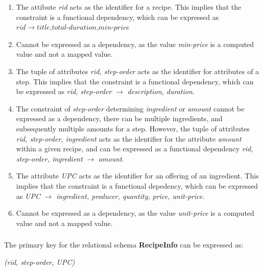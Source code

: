 \documentclass[letterpaper]{article}
\theoremstyle{plain}
\theoremstyle{definition}
\theoremstyle{remark}
\begin{document}
\begin{enumerate}
    \item The attibute \textit{rid} acts as the identifier for a recipe. This implies that the constraint is a functional dependency, which can be expressed as $rid \rightarrow \textit{title,total-duration,min-price}$
    \item Cannot be expressed as a dependency, as the value \textit{min-price} is a computed value and not a mapped value.
    \item The tuple of attributes \textit{rid, step-order} acts as the identifier for attributes of a step. This implies that the constraint is a functional dependency, which can be expressed as \textit{rid, step-order} $\rightarrow$ \textit{description, duration}.
    \item The constraint of \textit{step-order} determining \textit{ingredient} or \textit{amount} cannot be expressed as a dependency, there can be multiple ingredients, and subsequently multiple amounts for a step. However, the tuple of attributes \textit{rid, step-order, ingredient} acts as the identifier for the attribute \textit{amount} within a given recipe, and can be expressed as a functional dependency \textit{rid, step-order, ingredient} $\rightarrow$ \textit{amount}.
    \item The attribute \textit{UPC} acts as the identifier for an offering of an ingredient. This implies that the constraint is a functional depedency, which can be expressed as \textit{UPC} $\rightarrow$ \textit{ingredient, producer, quantity, price, unit-price}.
    \item Cannot be expressed as a dependency, as the value \textit{unit-price} is a computed value and not a mapped value.
\end{enumerate}

\subsubsection{}
The primary key for the relational schema \textbf{RecipeInfo} can be expressed as:
\begin{center}
    \textit{(rid, step-order, UPC)}
\end{center}

\section{}
\subsection{}
\end{document}
